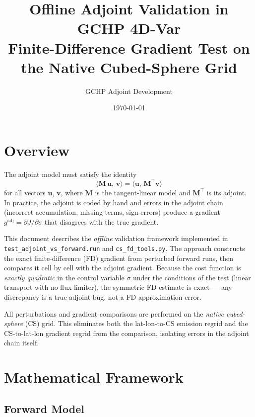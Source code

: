\documentclass[12pt]{article}
\title{\textbf{Offline Adjoint Validation in GCHP 4D-Var}\\
\large Finite-Difference Gradient Test on the Native Cubed-Sphere Grid}
\author{GCHP Adjoint Development}
\date{\today}
\newcommand{\gadj}{g^{\mathrm{adj}}}
\begin{document}
\maketitle
\tableofcontents
\newpage

\section{Overview}

The adjoint model must satisfy the identity
\begin{equation}
  \langle \mathbf{M}\,\mathbf{u},\,\mathbf{v} \rangle
  = \langle \mathbf{u},\,\mathbf{M}^{\top}\mathbf{v} \rangle
\end{equation}
for all vectors $\mathbf{u}$, $\mathbf{v}$, where $\mathbf{M}$ is the
tangent-linear model and $\mathbf{M}^{\top}$ is its adjoint.  In practice,
the adjoint is coded by hand and errors in the adjoint chain (incorrect
accumulation, missing terms, sign errors) produce a gradient
$\gadj = \partial J/\partial \sigma$ that disagrees with the true gradient.

This document describes the \emph{offline} validation framework implemented in
\texttt{test\_adjoint\_vs\_forward.run} and \texttt{cs\_fd\_tools.py}.  The
approach constructs the exact finite-difference (FD) gradient from perturbed
forward runs, then compares it cell by cell with the adjoint gradient.  Because
the cost function is \emph{exactly quadratic} in the control variable $\sigma$
under the conditions of the test (linear transport with no flux limiter), the
symmetric FD estimate is exact --- any discrepancy is a true adjoint bug, not a
FD approximation error.

All perturbations and gradient comparisons are performed on the \emph{native
cubed-sphere} (CS) grid.  This eliminates both the lat-lon-to-CS emission
regrid and the CS-to-lat-lon gradient regrid from the comparison, isolating
errors in the adjoint chain itself.

\section{Mathematical Framework}

\subsection{Forward Model}
\end{document}
